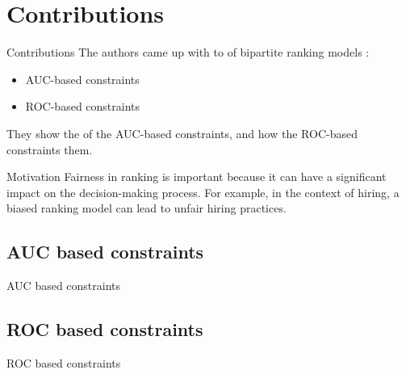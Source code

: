 \section{Contributions}
\begin{frame}{Contributions}
    The authors came up with  to  of bipartite ranking models :
  \begin{itemize}
      \item AUC-based constraints
      \item ROC-based constraints
  \end{itemize}
  
  They show the  of the AUC-based constraints, and how the ROC-based constraints  them.
\end{frame}

\begin{frame}{Motivation}
    Fairness in ranking is important because it can have a significant impact on the decision-making process. For example, in the context of hiring, a biased ranking model can lead to unfair hiring practices.
\end{frame}


\subsection{AUC based constraints}
\begin{frame}{AUC based constraints}

\end{frame}

\subsection{ROC based constraints}
\begin{frame}{ROC based constraints}
\end{frame}
